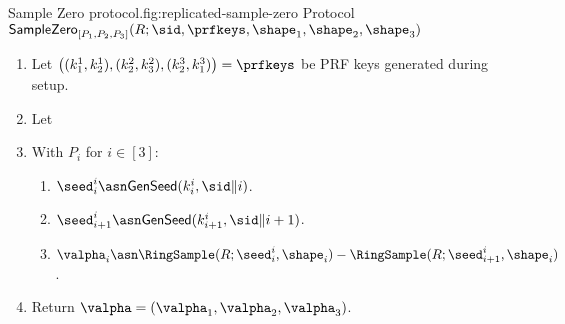 \begin{Boxfig}{Sample Zero protocol.}{fig:replicated-sample-zero}
  {Protocol $\mathsf{SampleZero}_{[P_1, P_2, P_3]}(R; \sid, \prfkeys, \shape_1, \shape_2, \shape_3)$}
  
  \begin{enumerate}
  \item Let $\left( (k_1^1, k_2^1), (k_2^2, k_3^2), (k_2^3, k_1^3) \right) = \prfkeys$ be PRF keys generated during setup.
  
  \item Let 
  
  \item With $P_i$ for $i \in [3]$:
  \begin{enumerate}
    \item ${\seed}^i_i \asn \mathsf{GenSeed}(k^i_i, \sid \| i)$.
    \item ${\seed}^i_{i+1} \asn \mathsf{GenSeed}(k^i_{i+1}, \sid \| i + 1)$.
    \item $\valpha_i \asn \RingSample(R; \seed^i_i, \shape_i) - \RingSample(R; \seed^i_{i+1}, \shape_i)$.
  \end{enumerate}
  
  \item Return $\valpha = \left( \valpha_1, \valpha_2, \valpha_3 \right)$.
  \end{enumerate}
\end{Boxfig}